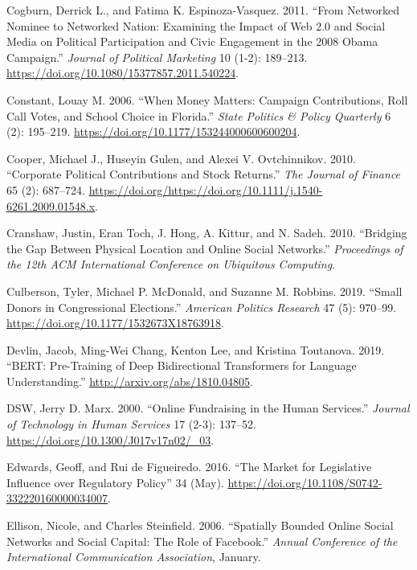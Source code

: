 \documentclass[12pt,]{article}
\begin{document}
\leavevmode\hypertarget{ref-cogburn2011}{}%
Cogburn, Derrick L., and Fatima K. Espinoza-Vasquez. 2011. ``From
Networked Nominee to Networked Nation: Examining the Impact of Web 2.0
and Social Media on Political Participation and Civic Engagement in the
2008 Obama Campaign.'' \emph{Journal of Political Marketing} 10 (1-2):
189--213. \url{https://doi.org/10.1080/15377857.2011.540224}.

\leavevmode\hypertarget{ref-constant2006}{}%
Constant, Louay M. 2006. ``When Money Matters: Campaign Contributions,
Roll Call Votes, and School Choice in Florida.'' \emph{State Politics \&
Policy Quarterly} 6 (2): 195--219.
\url{https://doi.org/10.1177/153244000600600204}.

\leavevmode\hypertarget{ref-cooper2010}{}%
Cooper, Michael J., Huseyin Gulen, and Alexei V. Ovtchinnikov. 2010.
``Corporate Political Contributions and Stock Returns.'' \emph{The
Journal of Finance} 65 (2): 687--724.
\url{https://doi.org/https://doi.org/10.1111/j.1540-6261.2009.01548.x}.

\leavevmode\hypertarget{ref-cranshaw2010}{}%
Cranshaw, Justin, Eran Toch, J. Hong, A. Kittur, and N. Sadeh. 2010.
``Bridging the Gap Between Physical Location and Online Social
Networks.'' \emph{Proceedings of the 12th ACM International Conference
on Ubiquitous Computing}.

\leavevmode\hypertarget{ref-culberson2019}{}%
Culberson, Tyler, Michael P. McDonald, and Suzanne M. Robbins. 2019.
``Small Donors in Congressional Elections.'' \emph{American Politics
Research} 47 (5): 970--99.
\url{https://doi.org/10.1177/1532673X18763918}.

\leavevmode\hypertarget{ref-bert}{}%
Devlin, Jacob, Ming-Wei Chang, Kenton Lee, and Kristina Toutanova. 2019.
``BERT: Pre-Training of Deep Bidirectional Transformers for Language
Understanding.'' \url{http://arxiv.org/abs/1810.04805}.

\leavevmode\hypertarget{ref-marx2000}{}%
DSW, Jerry D. Marx. 2000. ``Online Fundraising in the Human Services.''
\emph{Journal of Technology in Human Services} 17 (2-3): 137--52.
\url{https://doi.org/10.1300/J017v17n02/_03}.

\leavevmode\hypertarget{ref-edwards2016}{}%
Edwards, Geoff, and Rui de Figueiredo. 2016. ``The Market for
Legislative Influence over Regulatory Policy'' 34 (May).
\url{https://doi.org/10.1108/S0742-332220160000034007}.

\leavevmode\hypertarget{ref-ellison2006}{}%
Ellison, Nicole, and Charles Steinfield. 2006. ``Spatially Bounded
Online Social Networks and Social Capital: The Role of Facebook.''
\emph{Annual Conference of the International Communication Association},
January.
\end{document}
